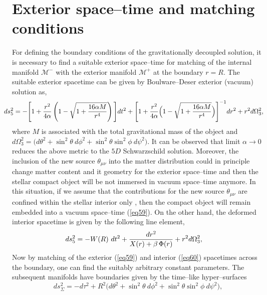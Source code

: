 \documentclass[]{aastex631}
\begin{document}
\section{Exterior space--time and matching conditions} \label{sec4}
For defining the boundary conditions of the gravitationally decoupled solution, it is necessary to find a suitable  exterior space--time for matching of the internal manifold $\mathcal{M}^{-}$ with the exterior manifold $\mathcal{M}^{+}$ at the boundary $r=R$. The suitable exterior spacetime can be given by Boulware--Deser \citep{boul} exterior (vacuum) solution as, 
\begin{eqnarray}
&& \hspace{-0.8cm}ds^2_{5} = -\Bigg[1+\frac{r^2}{4 \alpha}
\left(1-\sqrt{1+\frac{16\alpha M}{r^4}}\right)\Bigg] dt^2 + \Bigg[1+\frac{r^2}{4 \alpha}
\Big(1-\sqrt{1+\frac{16\alpha M}{r^4}}\Big)\Bigg]^{-1}{dr^2} + r^{2}d\Omega^2_3, \label{eq59}
\end{eqnarray}
where $M$ is associated with the total gravitational mass of the object  and $d\Omega^2_3=\big(d \theta^2 +\sin^2 \theta ~d\phi^2+\sin^2 \theta \sin^2 \phi ~d\psi^2 \big)$. 
It can be observed that limit $\alpha \to 0$ reduces the above metric to the $5D$ Schwarzschild solution. Moreover, the inclusion of the new source $\theta_{\mu\nu}$ into the matter distribution could in principle change matter content and it geometry for the exterior space--time and then the stellar compact object will be not immersed in vacuum space--time anymore. In this situation, if we assume that the contributions for the new source $\theta_{\mu\nu}$ are confined within the stellar interior only \citep{Ovalle2018}, then the compact object will remain embedded into a vacuum space--time (\ref{eq59}). On the other hand, the deformed interior spacetime is given by the following line element,
\begin{eqnarray}\label{exterior}
&& \hspace{-0.8cm}ds^2_{5} = -W(R) ~dt^2 + \frac{dr^2}{X(r)+\beta\,\Phi(r)} + r^{2}d\Omega^2_3, \label{eq60}
\end{eqnarray}
Now by matching of the exterior (\ref{eq59}) and interior (\ref{eq60}) spacetimes across the boundary, one can find the suitably arbitrary constant parameters. The subsequent manifolds have boundaries given by the time--like hyper--surfaces 
\begin{equation}
ds^{2}_{\Sigma} = - d\tau^2+R^{2}\big(d \theta^2+\sin^2 \theta~ d\phi^2+\sin^2 \theta \sin^2 \phi ~d\psi^2 \big),  \label{eq61}
\end{equation}
\end{document}
